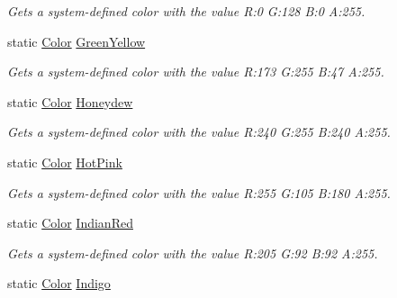 \begin{DoxyCompactItemize}
\begin{DoxyCompactList}\small\item\em Gets a system-\/defined color with the value R\+:0 G\+:128 B\+:0 A\+:255.\end{DoxyCompactList}\item 
static \hyperlink{structMicrosoft_1_1Xna_1_1Framework_1_1Color}{Color} \hyperlink{structMicrosoft_1_1Xna_1_1Framework_1_1Color_a27371c3038e58b3541429413089d90f2}{Green\+Yellow}
\begin{DoxyCompactList}\small\item\em Gets a system-\/defined color with the value R\+:173 G\+:255 B\+:47 A\+:255.\end{DoxyCompactList}\item 
static \hyperlink{structMicrosoft_1_1Xna_1_1Framework_1_1Color}{Color} \hyperlink{structMicrosoft_1_1Xna_1_1Framework_1_1Color_a046d4bed6a500f5322d1d9c791f0f703}{Honeydew}
\begin{DoxyCompactList}\small\item\em Gets a system-\/defined color with the value R\+:240 G\+:255 B\+:240 A\+:255.\end{DoxyCompactList}\item 
static \hyperlink{structMicrosoft_1_1Xna_1_1Framework_1_1Color}{Color} \hyperlink{structMicrosoft_1_1Xna_1_1Framework_1_1Color_a7ea3ebc430cda6473c6099d11bd91783}{Hot\+Pink}
\begin{DoxyCompactList}\small\item\em Gets a system-\/defined color with the value R\+:255 G\+:105 B\+:180 A\+:255.\end{DoxyCompactList}\item 
static \hyperlink{structMicrosoft_1_1Xna_1_1Framework_1_1Color}{Color} \hyperlink{structMicrosoft_1_1Xna_1_1Framework_1_1Color_ac255c4c0e21eda9a7c7880fcaea4050f}{Indian\+Red}
\begin{DoxyCompactList}\small\item\em Gets a system-\/defined color with the value R\+:205 G\+:92 B\+:92 A\+:255.\end{DoxyCompactList}\item 
static \hyperlink{structMicrosoft_1_1Xna_1_1Framework_1_1Color}{Color} \hyperlink{structMicrosoft_1_1Xna_1_1Framework_1_1Color_a3ffccddba75991c15ba0c0e062548f2b}{Indigo}

\end{DoxyCompactItemize}

